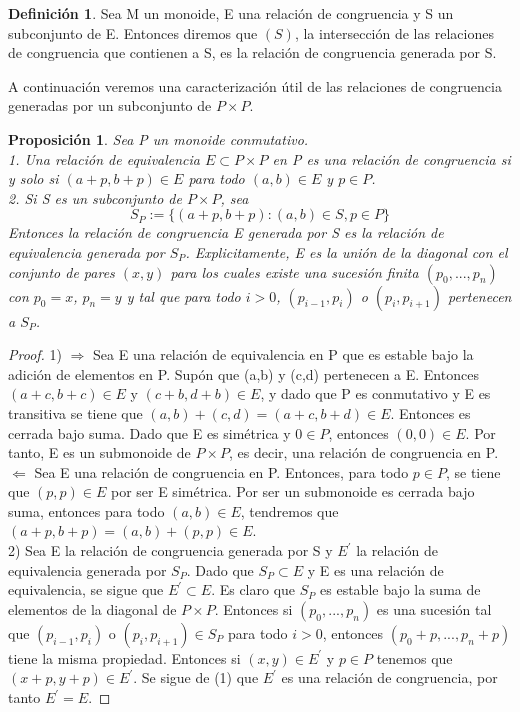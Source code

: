 \documentclass[12pt,spanish]{amsart}
\newtheorem{prop}[Theorem]{Proposición}
\theoremstyle{definition}
\newtheorem{Def}[Theorem]{Definición}
\theoremstyle{remark}
\begin{document}
\begin{Def}
Sea M un monoide, E una relación de congruencia y S un subconjunto de E. Entonces diremos que $(S)$, la intersección de las relaciones de congruencia que contienen a S, es la relación de congruencia generada por S. 
\end{Def}

A continuación veremos una caracterización útil de las relaciones de congruencia generadas por un subconjunto de $P\times P$. \\ 

\begin{prop}
Sea P un monoide conmutativo. \\
1. Una relación de equivalencia $E \subset P\times P$ en P es una relación de congruencia si y solo si $(a+p,b+p)\in E$ para todo $(a,b)\in E$ y $p\in P$. \\
2. Si S es un subconjunto de $P\times P$, sea 
$$S_{P}:= \{(a+p,b+p):(a,b)\in S,p\in P\}$$
Entonces la relación de congruencia E generada por S es la relación de equivalencia generada por $S_{P}$. Explicitamente, E es la unión de la diagonal con el conjunto de pares $(x,y)$ para los cuales existe una sucesión finita $(p_{0},...,p_{n})$ con $p_{0}=x$, $p_{n}=y$ y tal que para todo $i>0$, $(p_{i-1},p_{i})$ o $(p_{i},p_{i+1})$ pertenecen a $S_{P}$.
\end{prop}

\begin{proof}
1) $\Rightarrow$ Sea E una relación de equivalencia en P que es estable bajo la adición de elementos en P. Supón que (a,b) y (c,d) pertenecen a E. Entonces $(a+c,b+c)\in E$ y $(c+b,d+b)\in E$, y dado que P es conmutativo y E es transitiva se tiene que $(a,b)+(c,d)=(a+c,b+d)\in E$. Entonces es cerrada bajo suma. Dado que E es simétrica y $0\in P$, entonces $(0,0)\in E$. Por tanto, E es un submonoide de $P\times P$, es decir, una relación de congruencia en P.  \\
$\Leftarrow$ Sea E una relación de congruencia en P. Entonces, para todo $p\in P$, se tiene que $(p,p)\in E$ por ser E simétrica. Por ser un submonoide es cerrada bajo suma, entonces para todo $(a,b)\in E$, tendremos que $(a+p,b+p)=(a,b)+(p,p)\in E$. \\

2) Sea E la relación de congruencia generada por S y $E^{\prime}$ la relación de equivalencia generada por $S_{P}$. Dado que $S_{P} \subset E$ y E es una relación de equivalencia, se sigue que $E^{\prime} \subset E$. Es claro que $S_{P}$ es estable bajo la suma de elementos de la diagonal de $P\times P$. Entonces si $(p_{0},...,p_{n})$ es una sucesión tal que $(p_{i-1},p_{i})$ o $(p_{i},p_{i+1})\in S_{P}$ para todo $i>0$, entonces $(p_{0}+p,...,p_{n}+p)$ tiene la misma propiedad. Entonces si $(x,y)\in E^{\prime}$ y $p\in P$ tenemos que $(x+p,y+p)\in E^{\prime}$. Se sigue de (1) que $E^{\prime}$ es una relación de congruencia, por tanto $E^{\prime}=E$.
\end{proof}
\end{document}
